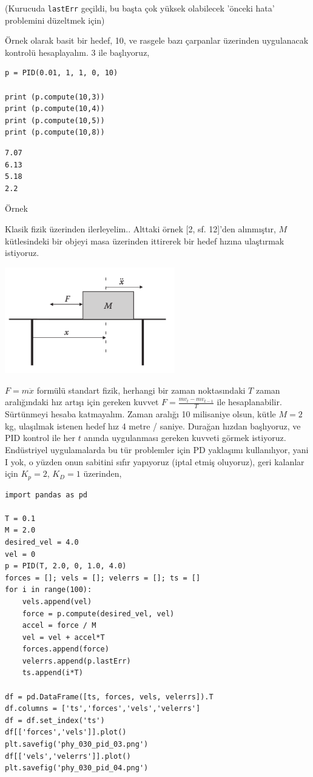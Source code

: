 \documentclass[12pt,fleqn]{article}\usepackage{../../common}
\begin{document}
(Kurucuda \verb!lastErr! geçildi, bu başta çok yüksek olabilecek 'önceki
hata' problemini düzeltmek için)

Örnek olarak basit bir hedef, 10, ve rasgele bazı çarpanlar üzerinden
uygulanacak kontrolü hesaplayalım. 3 ile başlıyoruz,

\begin{verbatim}
p = PID(0.01, 1, 1, 0, 10)

print (p.compute(10,3))
print (p.compute(10,4))
print (p.compute(10,5))
print (p.compute(10,8))
\end{verbatim}

\begin{verbatim}
7.07
6.13
5.18
2.2
\end{verbatim}

Örnek

Klasik fizik üzerinden ilerleyelim.. Alttaki örnek [2, sf. 12]'den
alınmıştır, $M$ kütlesindeki bir objeyi masa üzerinden ittirerek bir hedef
hızına ulaştırmak istiyoruz. 

\includegraphics[width=20em]{phy_030_pid_02.png}

$F = m \ddot{x}$ formülü standart fizik, herhangi bir zaman noktasındaki
$T$ zaman aralığındaki hız artışı için gereken kuvvet
$F = \frac{m v_t - m v_{t-1}}{T}$ ile hesaplanabilir. Sürtünmeyi hesaba
katmayalım. Zaman aralığı 10 milisaniye olsun, kütle $M = 2$ kg, ulaşılmak
istenen hedef hız 4 metre / saniye. Durağan hızdan başlıyoruz, ve PID
kontrol ile her $t$ anında uygulanması gereken kuvveti görmek
istiyoruz. Endüstriyel uygulamalarda bu tür problemler için PD yaklaşımı
kullanılıyor, yani I yok, o yüzden onun sabitini sıfır yapıyoruz (iptal
etmiş oluyoruz), geri kalanlar için $K_p=2$, $K_D=1$ üzerinden,

\begin{verbatim}
import pandas as pd

T = 0.1
M = 2.0
desired_vel = 4.0
vel = 0
p = PID(T, 2.0, 0, 1.0, 4.0)
forces = []; vels = []; velerrs = []; ts = []
for i in range(100):
    vels.append(vel)
    force = p.compute(desired_vel, vel)
    accel = force / M
    vel = vel + accel*T
    forces.append(force)
    velerrs.append(p.lastErr)
    ts.append(i*T)

df = pd.DataFrame([ts, forces, vels, velerrs]).T
df.columns = ['ts','forces','vels','velerrs']
df = df.set_index('ts')
df[['forces','vels']].plot()
plt.savefig('phy_030_pid_03.png')
df[['vels','velerrs']].plot()
plt.savefig('phy_030_pid_04.png')
\end{verbatim}
\end{document}
